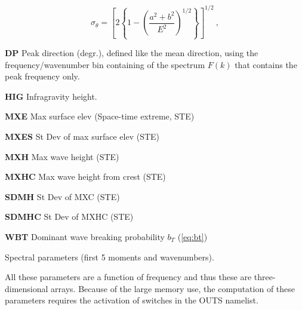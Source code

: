 \begin{list}{)\hfill}
\begin{list}{)\hfill}
      \begin{equation} \sigma_\theta = \left [ 2 \left \{ 1 - \left (
      \frac{a^2+b^2}{E^2} \right )^{1/2} \right \} \right ]^{1/2}
      \: , \label{eq:sig_th} \end{equation}
\item \textbf{DP} Peak direction (degr.), defined like the mean direction, using the
      frequency/wavenumber bin containing of the spectrum $F(k)$ that
      contains the peak frequency only.
\item \textbf{HIG} Infragravity height.
\item \textbf{MXE}   Max surface elev (Space-time extreme, STE)
\item \textbf{MXES}  St Dev of max surface elev (STE)
\item \textbf{MXH}  Max wave height (STE)
\item \textbf{MXHC}  Max wave height from crest (STE)
\item \textbf{SDMH}  St Dev of MXC (STE)
\item \textbf{SDMHC} St Dev of MXHC (STE)
\item \textbf{WBT}   Dominant wave breaking probability $b_T$ (\ref{eq:bt})
\end{list}

\item{Spectral parameters (first 5 moments and wavenumbers). 

All these parameters are a function 
of frequency and thus these are three-dimensional arrays. Because of the large memory use, the 
computation of these parameters requires the activation of switches in the {\F OUTS} namelist.}

\begin{list}{)\hfill}
            { \leftmargin 8mm 
             \rightmargin 0mm \itemsep 0mm \parsep 0mm}
   

\end{list}
\end{list}
